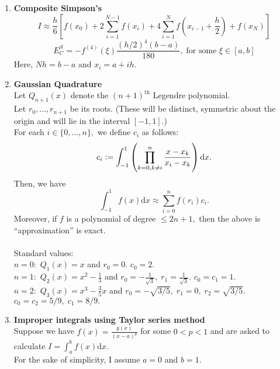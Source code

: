 \documentclass[12pt]{article}
\theoremstyle{definition}
\begin{document}
\begin{enumerate}
	\item \textbf{Composite Simpson's}
	\[I \approx \frac{h}{6}\left[f(x_0) + 2\sum_{i=1}^{N-1}f(x_i) + 4\sum_{i=1}^{N}f\left(x_{i-1} + \frac{h}{2}\right) + f(x_N)\right]\]
	\[E_C^{S} = -f^{(4)}(\xi)\frac{(h/2)^4(b-a)}{180},\;\text{for some }\xi\in[a, b]\]
	Here, $Nh = b-a$ and $x_i = a + ih.$\\
	\item \textbf{Gaussian Quadrature}\\
	Let $Q_{n+1}(x)$ denote the $(n+1)^{\text{th}}$ Legendre polynomial.\\
	Let $r_0, \ldots, r_{n+1}$ be its roots. (These will be distinct, symmetric about the origin and will lie in the interval $[-1, 1].$)\\
	For each $i \in \{0, \ldots, n\},$ we define $c_i$ as follows:
	\[c_i \vcentcolon= \int_{-1}^{1} \left(\prod_{k = 0, k \neq i}^{n}\frac{x - x_k}{x_i - x_k}\right) {\mathrm d}x.\]
	Then, we have
	\[\int_{-1}^{1} f(x) {\mathrm d}x \approx \displaystyle\sum_{i=0}^{n}f(r_i)c_i.\]
	Moreover, if $f$ is a polynomial of degree $\le 2n+1,$ then the above is ``approximation'' is exact.\\~\\
	Standard values: \\
	$n = 0:$ $Q_1(x) = x$ and $r_0 = 0.$ $c_0 = 2.$\\
	$n = 1:$ $Q_2(x) = x^2 - \frac{1}{3}$ and $r_0 = -\frac{1}{\sqrt{3}},\;r_1 = \frac{1}{\sqrt{3}}.$ $c_0 = c_1 = 1.$\\
	$n = 2:$ $Q_3(x) = x^3 - \frac{3}{5}x$ and $r_0 = -\sqrt{3/5},\;r_1 = 0,\; r_2 = \sqrt{3/5}.$ $c_0 = c_2 = 5/9,\;c_1 = 8/9.$
	\item \textbf{Improper integrals using Taylor series method}\\
	Suppose we have $f(x) = \frac{g(x)}{(x - a)^p}$ for some $0 < p < 1$ and are asked to calculate $I = \displaystyle\int_{a}^{b} f(x) {\mathrm d}x.$\\
	For the sake of simplicity, I assume $a = 0$ and $b = 1.$


\end{enumerate}
\end{document}
